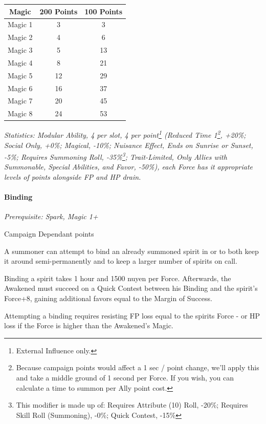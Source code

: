 \begin{multicols}{3}
	\begin{center}
		\begin{tabular}{|c|c|c|}
			\hline
			Magic & 200 Points & 100 Points \\
			\hline
			\hline
			Magic 1 & 3 & 3 \\
			Magic 2 & 4 & 6 \\
			Magic 3 & 5 & 13 \\
			Magic 4 & 8 & 21 \\
			Magic 5 & 12 & 29 \\
			Magic 6 & 16 & 37 \\
			Magic 7 & 20 & 45 \\
			Magic 8 & 24 & 53 \\
			\hline
		\end{tabular}
	\end{center}
	
	\textit{\textcolor{OliveGreen}{Statistics: Modular Ability, 4 per slot, 4 per point\footnote{External Influence only.} (Reduced Time 1\footnote{Because campaign points would affect a 1 sec / point change, we'll apply this and take a middle ground of 1 second per Force. If you wish, you can calculate a time to summon per Ally point cost.}, +20\%; Social Only, +0\%; Magical, -10\%; Nuisance Effect, Ends on Sunrise or Sunset, -5\%; Requires Summoning Roll, -35\%\footnote{This modifier is made up of: Requires Attribute (10) Roll, -20\%; Requires Skill Roll (Summoning), -0\%; Quick Contest, -15\%}; Trait-Limited, Only Allies with Summonable, Special Abilities, and Favor, -50\%), each Force has it appropriate levels of points alongside FP and HP drain.}}
	
	\paragraph{Binding}\label{binding_spirits}
	\textit{Prerequisite: Spark, Magic 1+}
	\begin{flushright}
		Campaign Dependant points
	\end{flushright}
		
	A summoner can attempt to bind an already summoned spirit in or to both keep it around semi-permanently and to keep a larger number of spirits on call.
	
	Binding a spirit takes 1 hour and 1500 nuyen per Force. Afterwards, the Awakened must succeed on a Quick Contest between his Binding and the spirit's Force+8, gaining additional favors equal to the Margin of Success.
	
	Attempting a binding requires resisting FP loss equal to the spirits Force - or HP loss if the Force is higher than the Awakened's Magic. 
	

\end{multicols}
